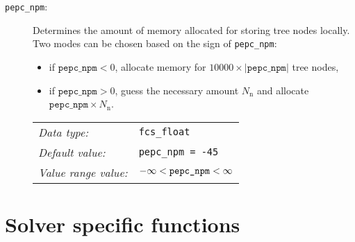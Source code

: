 \begin{description}
  \item[\texttt{pepc\_npm}:] Determines the amount of memory allocated for storing tree nodes locally.
    Two modes can be chosen based on the sign of \texttt{pepc\_npm}:
    \begin{itemize}
      \item if $\mathtt{pepc\_npm} < 0$, allocate memory for $10000 \times \left| \mathtt{pepc\_npm} \right|$ tree nodes,
      \item if $\mathtt{pepc\_npm} > 0$, guess the necessary amount $N_{\mathrm{n}}$ and allocate $\mathtt{pepc\_npm} \times N_{\mathrm{n}}$.
    \end{itemize}

	\begin{tabular}{ll}
	   \textit{Data type:}         & \texttt{fcs\_float} \\
	   \textit{Default value:}     & \texttt{pepc\_npm = -45} \\
	   \textit{Value range value:} & \texttt{$-\infty < \text{\texttt{pepc\_npm}} < \infty$}
	\end{tabular}

\end{description}


\section*{Solver specific functions}

